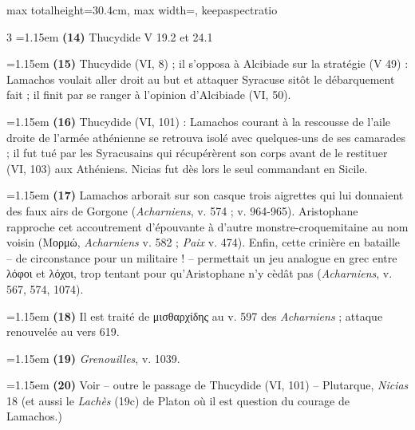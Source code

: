 \documentclass[11pt,twoside]{book}
\newcommand{\italique}[1]{\textit{#1}}
\begin{document}
\begin{adjustbox}{max totalheight=30.4cm, max width=\textwidth, keepaspectratio}
\begin{minipage}{\textwidth}
{\begin{multicols}{3}
\noindent\hangindent=1.15em {\color{sepiaNote}\textbf{(14)}} Thucydide V 19.2 et 24.1
\par\vspace{1.5pt}
\noindent\hangindent=1.15em {\color{sepiaNote}\textbf{(15)}} Thucydide (VI, 8) ; il s'opposa à Alcibiade sur la stratégie (V 49) : Lamachos voulait aller droit au but et attaquer Syracuse sitôt le débarquement fait ; il finit par se ranger à l'opinion d'Alcibiade (VI, 50).
\par\vspace{1.5pt}
\noindent\hangindent=1.15em {\color{sepiaNote}\textbf{(16)}} Thucydide (VI, 101) : Lamachos courant à la rescousse de l'aile droite de l'armée athénienne se retrouva isolé avec quelques-uns de ses camarades ; il fut tué par les Syracusains qui récupérèrent son corps avant de le restituer (VI, 103) aux Athéniens. Nicias fut dès lors le seul commandant en Sicile.
\par\vspace{1.5pt}
\noindent\hangindent=1.15em {\color{sepiaNote}\textbf{(17)}} Lamachos arborait sur son casque trois aigrettes qui lui donnaient des faux airs de Gorgone (\italique{Acharniens}, v. 574 ; v. 964-965). Aristophane rapproche cet accoutrement d'épouvante à d'autre monstre-croquemitaine au nom voisin (Μορμώ, \italique{Acharniens} v. 582 ; \italique{Paix} v. 474). Enfin, cette crinière en bataille -- de circonstance pour un militaire ! -- permettait un jeu analogue en grec entre λόφοι et λόχοι, trop tentant pour qu'Aristophane n'y cèdât pas (\italique{Acharniens}, v. 567, 574, 1074).
\par\vspace{1.5pt}
\noindent\hangindent=1.15em {\color{sepiaNote}\textbf{(18)}} Il est traité de μισθαρχίδης au v. 597 des \italique{Acharniens} ; attaque renouvelée au vers 619.
\par\vspace{1.5pt}
\noindent\hangindent=1.15em {\color{sepiaNote}\textbf{(19)}} \italique{Grenouilles}, v. 1039.
\par\vspace{1.5pt}
\noindent\hangindent=1.15em {\color{sepiaNote}\textbf{(20)}} Voir -- outre le passage de Thucydide (VI, 101) -- Plutarque, \italique{Nicias} 18 (et aussi le \italique{Lachès} (19c) de Platon où il est question du courage de Lamachos.)
\par\vspace{1.5pt}

\end{multicols}}
\end{minipage}
\end{adjustbox}
\end{document}
